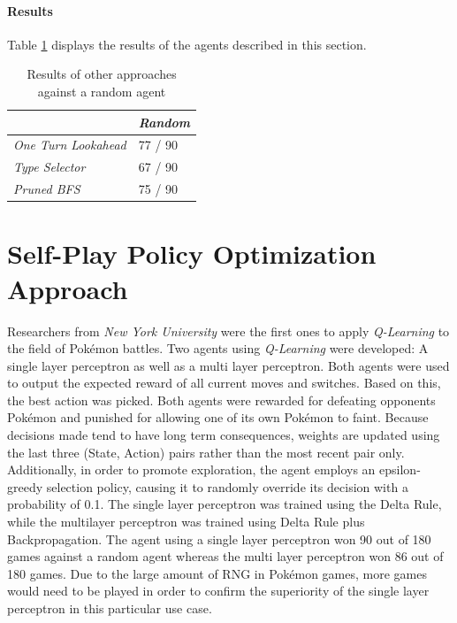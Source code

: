 \paragraph{Results}
Table \ref{tbl:AI-Comp-Results} displays the results of the agents described in this section.
\begin{table}[h]
    \centering
        \begin{tabular}{|l|l|}
            \hline
            & \emph{Random} \\
            \hline
            \emph{One Turn Lookahead} & 77 / 90 \\
            \hline
            \emph{Type Selector} & 67 / 90 \\
            \hline
            \emph{Pruned \ac{BFS}} & 75 / 90 \\
            \hline
        \end{tabular}
        \caption{Results of other approaches against a random agent \cite{Lee_Togelius_2017}}
        \label{tbl:AI-Comp-Results}
\end{table}

\section{Self-Play Policy Optimization Approach}
Researchers from \textit{New York University} \cite{Lee_Togelius_2017} were the first ones to apply
\textit{Q-Learning} to the field of Pokémon battles. Two agents using \textit{Q-Learning}
were developed: A single layer perceptron as well as a multi layer perceptron. Both agents were 
used to output the expected reward of all current moves and switches. Based on this, the best 
action was picked. Both agents were rewarded for defeating opponents Pokémon and punished for 
allowing one of its own Pokémon to faint. Because decisions made tend to have long term consequences, 
weights are updated using the last three (State, Action) pairs rather than the most recent pair only.
Additionally, in order to promote exploration, the agent employs an epsilon-greedy selection policy, 
causing it to randomly override its decision with a probability of 0.1. The single layer perceptron 
was trained using the Delta Rule, while the multilayer perceptron was trained using Delta Rule 
plus Backpropagation. The agent using a single layer perceptron won 90 out of 180 games against a
random agent whereas the multi layer perceptron won 86 out of 180 games. Due to the large amount
of \ac{RNG} in Pokémon games, more games would need to be played in order to confirm the superiority
of the single layer perceptron in this particular use case. \\


